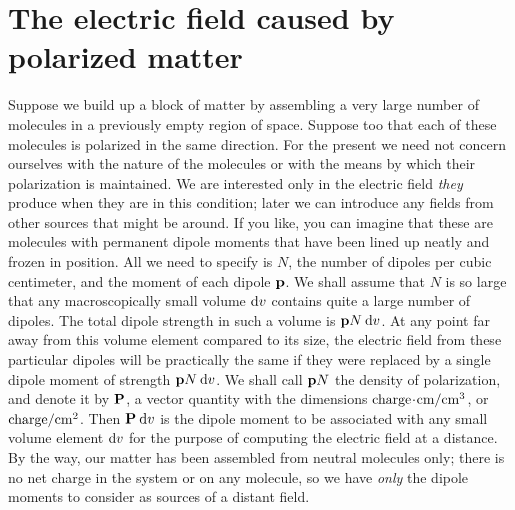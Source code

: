 \section{The electric field caused by polarized matter}

Suppose we build up a block of matter by assembling a very large
number of molecules in a previously empty region of space. Suppose
too that each of these molecules is polarized in the same direction.
For the present we need not concern ourselves with the nature of the
molecules or with the means by which their polarization is 
maintained. We are interested only in the electric field \emph{they} produce when
they are in this condition; later we can introduce any fields from other
sources that might be around. If you like, you can imagine that these
are molecules with permanent dipole moments that have been lined
up neatly and frozen in position. All we need to specify is $N$, the
number of dipoles per cubic centimeter, and the moment of each
dipole $\mathbf{p}$. We shall assume that $N$ is so large that any macroscopically
small volume $\textup{d} v$ contains quite a large number of dipoles. The total
dipole strength in such a volume is $\mathbf{p}N\: \textup{d} v$. At any point far away
from this volume element compared to its size, the electric field from
these particular dipoles will be practically the same if they were replaced
by a single dipole moment of strength $\mathbf{p}N\: \textup{d} v$. We shall call $\mathbf{p}N$
the density of polarization, and denote it by $\mathbf{P}$, a vector quantity with
the dimensions $\textup{charge}\!\cdot\!\textup{cm}/\textup{cm}^3$, or 
$\textup{charge}/\textup{cm}^2$. Then $\mathbf{P}\:\textup{d} v$ is the
dipole moment to be associated with any small volume element $\textup{d} v$
for the purpose of computing the electric field at a distance. By the
way, our matter has been assembled from neutral molecules only;
there is no net charge in the system or on any molecule, so we have
\emph{only} the dipole moments to consider as sources of a distant field.

